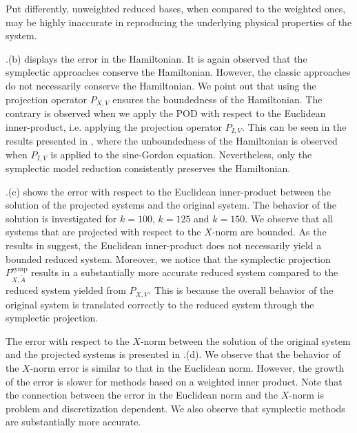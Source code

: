 Put differently, unweighted reduced bases, when compared to the weighted ones, may be highly inaccurate in reproducing the underlying physical properties of the system.

.(b) displays the error in the Hamiltonian. It is again observed that the symplectic approaches conserve the Hamiltonian. However, the classic approaches do not necessarily conserve the Hamiltonian. We point out that using the projection operator $P_{X,V}$ ensures the boundedness of the Hamiltonian. The contrary is observed when we apply the POD with respect to the Euclidean inner-product, i.e. applying the projection operator $P_{I,V}$. This can be seen in the results presented in \cite{doi:10.1137/140978922}, where the unboundedness of the Hamiltonian is observed when $P_{I,V}$ is applied to the sine-Gordon equation. Nevertheless, only the symplectic model reduction consistently preserves the Hamiltonian.

.(c) shows the error with respect to the Euclidean inner-product between the solution of the projected systems and the original system. The behavior of the solution is investigated for $k=100$, $k=125$ and $k=150$. We observe that all systems that are projected with respect to the $X$-norm are bounded. As the results in \cite{doi:10.1137/140978922} suggest, the Euclidean inner-product does not necessarily yield a bounded reduced system. Moreover, we notice that the symplectic projection $P^{\text{symp}}_{X,\tilde A}$ results in a substantially more accurate reduced system compared to the reduced system yielded from $P_{X,V}$. This is because the overall behavior of the original system is translated correctly to the reduced system through the symplectic projection.

The error with respect to the $X$-norm between the solution of the original system and the projected systems is presented in .(d). We observe that the behavior of the $X$-norm error is similar to that in the Euclidean norm. However, the growth of the error is slower for methods based on a weighted inner product. Note that the connection between the error in the Euclidean norm and the $X$-norm is problem and discretization dependent. We also observe that symplectic methods are substantially more accurate.

